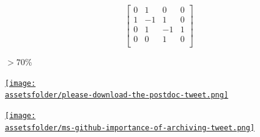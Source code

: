 \documentclass{beamer}
\newcommand{\assetsfolder}{./assets}
\begin{document}
    \begin{frame}
        \HUGE
        \[
            \begin{bmatrix}
                0  &  1  &  0  &  0 \\
                1  & -1  &  1  &  0 \\
                0  &  1  & -1  &  1 \\
                0  &  0  &  1  &  0 \\
            \end{bmatrix}
        \]

    \end{frame}

    \begin{frame}
        \begin{center}
            \Large
        \end{center}

    \end{frame}

    \begin{frame}
        \begin{center}
            \fontsize{60}{70}\selectfont \(> 70\%\)
        \end{center}

    \end{frame}

    \begin{frame}
        \begin{center}
            \href{https://twitter.com/ianholmes/status/288689712636493824?lang=en}{\texttt{[image: \\assetsfolder/please-download-the-postdoc-tweet.png]}}
        \end{center}
    \end{frame}

    \begin{frame}
        \begin{center}
            \href{https://twitter.com/betatim/status/1004077975233552385}{\texttt{[image: \\assetsfolder/ms-github-importance-of-archiving-tweet.png]}}
        \end{center}
    \end{frame}
\end{document}
